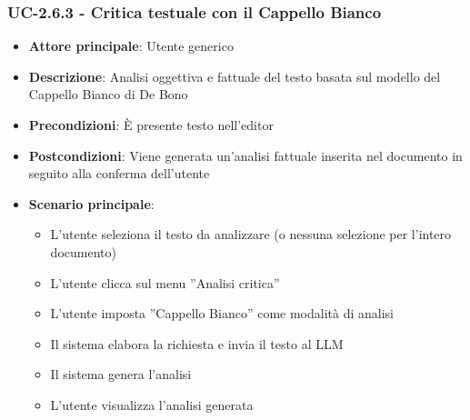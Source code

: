 \documentclass[11pt,a4paper]{article}
\begin{document}
\subsubsection{UC-2.6.3 - Critica testuale con il Cappello Bianco}
\begin{itemize}
    \item \textbf{Attore principale}: Utente generico
    \item \textbf{Descrizione}: Analisi oggettiva e fattuale del testo basata sul modello del Cappello Bianco di De Bono
    \item \textbf{Precondizioni}: È presente testo nell’editor
    \item \textbf{Postcondizioni}: Viene generata un’analisi fattuale inserita nel documento in seguito alla conferma dell'utente
    \item \textbf{Scenario principale}:
    \begin{itemize}
        \item L’utente seleziona il testo da analizzare (o nessuna selezione per l'intero documento)
        \item L’utente clicca sul menu ”Analisi critica”
        \item L’utente imposta ”Cappello Bianco” come modalità di analisi
        \item Il sistema elabora la richiesta e invia il testo al LLM
        \item Il sistema genera l'analisi 
        \item L'utente visualizza l'analisi generata
    \end{itemize}
\end{itemize}
\end{document}
